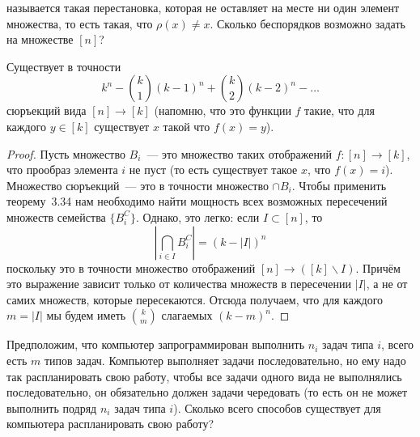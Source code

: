 \begin{exercise}
 называется такая перестановка, которая не оставляет на месте ни один элемент множества, то есть такая, что $\rho(x)\not=x$. Сколько беспорядков возможно задать на множестве $[n]$?
\end{exercise}

\begin{thm}
Существует в точности
$$k^n - {k \choose 1}(k-1)^n + {k\choose 2}(k-2)^n -\ldots$$
сюръекций вида $[n]\to[k]$ (напомню, что это функции $f$ такие, что для каждого $y\in[k]$ существует $x$ такой что $f(x) = y$).
\end{thm}
\begin{proof}
Пусть множество $B_i$~— это множество таких отображений $f:[n]\to[k]$, что прообраз элемента $i$ не пуст (то есть существует такое $x$, что $f(x) = i$). Множество сюръекций~— это в точности множество $\cap B_i$. Чтобы применить теорему~3.34 нам необходимо найти мощность всех возможных пересечений множеств семейства $\{B_i^C\}$. Однако, это легко: если $I\subset [n]$, то
$$\left|\bigcap_{i\in I} B_i^C\right| = (k-|I|)^n$$
поскольку это в точности множество отображений $[n]\to([k]\backslash I)$. Причём это выражение зависит только от количества множеств в пересечении $|I|$, а не от самих множеств, которые пересекаются. Отсюда получаем, что для каждого $m = |I|$ мы будем иметь $k\choose m$ слагаемых $(k-m)^n$.
\end{proof}

\begin{exercise}
Предположим, что компьютер запрограммирован выполнить $n_i$ задач типа $i$, всего есть $m$ типов задач. Компьютер выполняет задачи последовательно, но ему надо так распланировать свою работу, чтобы все задачи одного вида не выполнялись последовательно, он обязательно должен задачи чередовать (то есть он не может выполнить подряд $n_i$ задач типа $i$). Сколько всего способов существует для компьютера распланировать свою работу?
\end{exercise}
